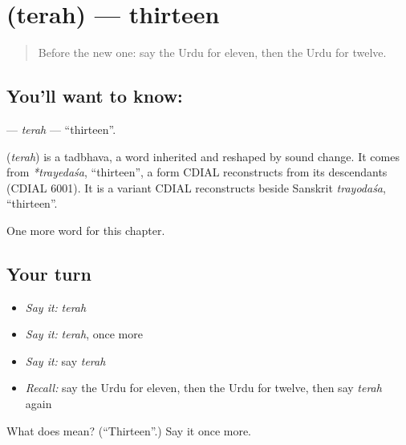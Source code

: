 \section[\texorpdfstring{\ur{تیرہ} (terah)}{تیرہ (terah)}]{ (terah) — thirteen}

\label{lesson:UR-C83-terah}



\begin{quote}
Before the new one: say the Urdu for eleven, then the Urdu for twelve.
\end{quote}

\subsection*{You'll want to know: }
\textbf{} — \emph{terah} — \textquotedblleft{}thirteen\textquotedblright{}.

\begin{cousinweb}
\textbf{} (\emph{terah}) is a tadbhava, a word inherited and reshaped by sound change. It comes from \emph{*trayedaśa}, \textquotedblleft{}thirteen\textquotedblright{}, a form CDIAL reconstructs from its descendants (CDIAL 6001). It is a variant CDIAL reconstructs beside Sanskrit \emph{trayodaśa}, \textquotedblleft{}thirteen\textquotedblright{}.
\end{cousinweb}

\begin{grammarlens}[title={What you've built}]
One more word for this chapter.
\end{grammarlens}

\subsection*{Your turn}
\begin{itemize}
\raggedright
  \item \emph{Say it:} \emph{terah}
  \item \emph{Say it:} \emph{terah}, once more
  \item \emph{Say it:} say \emph{terah}
  \item \emph{Recall:} say the Urdu for eleven, then the Urdu for twelve, then say \emph{terah} again
\end{itemize}

\begin{tcolorbox}[breakable,colback=teal!4,colframe=teal!35!black,title={Before you move on}]
What does  mean? (\textquotedblleft{}Thirteen\textquotedblright{}.) Say it once more.
\end{tcolorbox}
